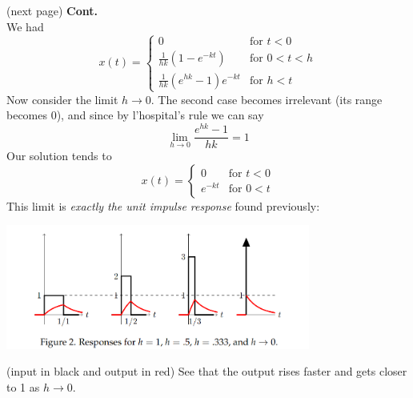 \documentclass{report}
\begin{document}
(next page)\newpage
\noindent\textbf{Cont.}\\
We had
\begin{equation*}
x(t)=\begin{cases}
0&\text{for }t<0\\
\frac{1}{hk}(1-e^{-kt})&\text{for }0<t<h\\
\frac{1}{hk}(e^{hk}-1)e^{-kt}&\text{for }h<t\end{cases}
\end{equation*}
Now consider the limit $h\to0$. The second case becomes irrelevant (its range becomes 0), and since by 
l'hospital's rule we can say
\begin{equation*}
\lim_{h\to0}\frac{e^{hk}-1}{hk}=1
\end{equation*}
Our solution tends to
\begin{equation*}
x(t)=\begin{cases}
0&\text{for }t<0\\
e^{-kt}&\text{for }0<t\end{cases}
\end{equation*}
This limit is \textit{exactly the unit impulse response} found previously:
\begin{center}
\includegraphics[width=10cm]{53}\\
\end{center}
(input in black and output in red) See that the output rises faster and gets closer to 1 as $h\to0$.
\newpage
\end{document}
